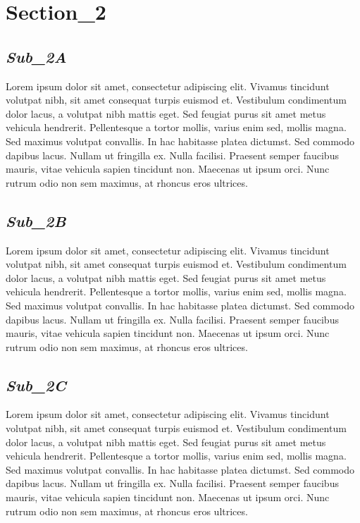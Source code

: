 \documentclass[a4paper]{article}
\begin{document}
\newpage
\section*{Section\_2}
	\begin{minipage}{0.9\textwidth}
		
		\subsection*{\textit{Sub\_2A}}
		Lorem ipsum dolor sit amet, consectetur adipiscing elit. Vivamus tincidunt volutpat nibh, sit amet consequat turpis euismod et. Vestibulum condimentum dolor lacus, a volutpat nibh mattis eget. Sed feugiat purus sit amet metus vehicula hendrerit. Pellentesque a tortor mollis, varius enim sed, mollis magna. Sed maximus volutpat convallis. In hac habitasse platea dictumst. Sed commodo dapibus lacus. Nullam ut fringilla ex. Nulla facilisi. Praesent semper faucibus mauris, vitae vehicula sapien tincidunt non. Maecenas ut ipsum orci. Nunc rutrum odio non sem maximus, at rhoncus eros ultrices.
		
		\subsection*{\textit{Sub\_2B}}
		Lorem ipsum dolor sit amet, consectetur adipiscing elit. Vivamus tincidunt volutpat nibh, sit amet consequat turpis euismod et. Vestibulum condimentum dolor lacus, a volutpat nibh mattis eget. Sed feugiat purus sit amet metus vehicula hendrerit. Pellentesque a tortor mollis, varius enim sed, mollis magna. Sed maximus volutpat convallis. In hac habitasse platea dictumst. Sed commodo dapibus lacus. Nullam ut fringilla ex. Nulla facilisi. Praesent semper faucibus mauris, vitae vehicula sapien tincidunt non. Maecenas ut ipsum orci. Nunc rutrum odio non sem maximus, at rhoncus eros ultrices.
		
		\subsection*{\textit{Sub\_2C}}
		Lorem ipsum dolor sit amet, consectetur adipiscing elit. Vivamus tincidunt volutpat nibh, sit amet consequat turpis euismod et. Vestibulum condimentum dolor lacus, a volutpat nibh mattis eget. Sed feugiat purus sit amet metus vehicula hendrerit. Pellentesque a tortor mollis, varius enim sed, mollis magna. Sed maximus volutpat convallis. In hac habitasse platea dictumst. Sed commodo dapibus lacus. Nullam ut fringilla ex. Nulla facilisi. Praesent semper faucibus mauris, vitae vehicula sapien tincidunt non. Maecenas ut ipsum orci. Nunc rutrum odio non sem maximus, at rhoncus eros ultrices.
		
	\end{minipage}
	
\end{document}
